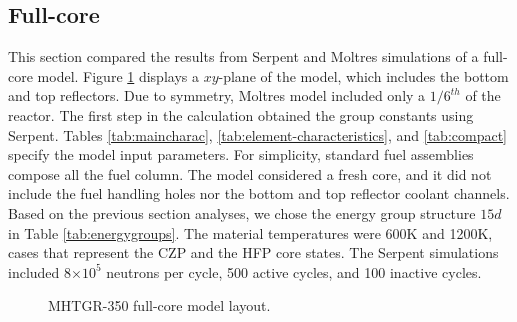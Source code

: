 \subsection{Full-core}

This section compared the results from Serpent and Moltres simulations of a full-core model.
Figure \ref{fig:fullcoremodel} displays a $xy$-plane of the model, which includes the bottom and top reflectors.
Due to symmetry, Moltres model included only a $1/6^{th}$ of the reactor.
The first step in the calculation obtained the group constants using Serpent.
Tables \ref{tab:maincharac}, \ref{tab:element-characteristics}, and \ref{tab:compact} specify the model input parameters.
For simplicity, standard fuel assemblies compose all the fuel column.
The model considered a fresh core, and it did not include the fuel handling holes nor the bottom and top reflector coolant channels.
Based on the previous section analyses, we chose the energy group structure $15d$ in Table \ref{tab:energygroups}.
The material temperatures were 600K and 1200K, cases that represent the \gls{CZP} and the \gls{HFP} core states.
The Serpent simulations included 8$\times 10^5$ neutrons per cycle, 500 active cycles, and 100 inactive cycles.

\begin{figure}[htbp!]
	\centering
	\hfill
  \caption{MHTGR-350 full-core model layout.}
	\label{fig:fullcoremodel}
\end{figure}

